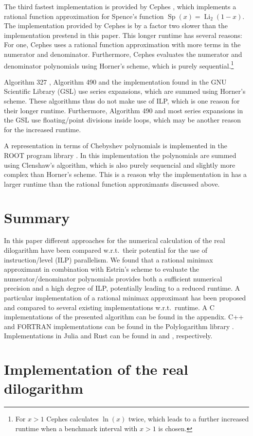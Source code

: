\documentclass[10pt,DIV16,twocolumn,numbers=noenddot]{scrartcl}
\newcommand{\Li}{\operatorname{Li}_2}
\begin{document}
The third fastest implementation is provided by Cephes \cite{cephes},
which implements a rational function approximation for Spence's
function $\operatorname{Sp}(x)=\Li(1-x)$.  The implementation provided
by Cephes is by a factor two slower than the implementation prestend
in this paper.  This longer runtime has several reasons: For one,
Cephes uses a rational function approximation with more terms in the
numerator and denominator.  Furthermore, Cephes evaluates the
numerator and denominator polynomials using Horner's scheme, which is
purely sequential.\footnote{For $x>1$ Cephes calculates $\ln(x)$
  twice, which leads to a further increased runtime when a benchmark
  interval with $x>1$ is chosen.}

Algorithm 327 \cite{koelbigDilog}, Algorithm 490 \cite{ginsberg} and
the implementation found in the GNU Scientific Library (GSL)
\cite{gsl} use series expansions, which are summed using Horner's
scheme.  These algorithms thus do not make use of ILP, which is one
reason for their longer runtime.  Furthermore, Algorithm 490 and most
series expansions in the GSL use floating\-/point divisions inside
loops, which may be another reason for the increased runtime.

A representation in terms of Chebyshev polynomials \cite{luke} is
implemented in the ROOT program library \cite{root}.  In this
implementation the polynomials are summed using Clenshaw's algorithm,
which is also purely sequencial and slightly more complex than
Horner's scheme.  This is a reason why the implementation in
\cite{root} has a larger runtime than the rational function
approximants discussed above.

\section{Summary}

In this paper different approaches for the numerical calculation of
the real dilogarithm have been compared w.r.t.\ their potential for
the use of instruction\-/level (ILP) parallelism.  We found that a
rational minimax approximant in combination with Estrin's scheme to
evaluate the numerator/denominator polynomials provides both a
sufficient numerical precision and a high degree of ILP, potentially
leading to a reduced runtime.  A particular implementation of a
rational minimax approximant has been proposed and compared to several
existing implementations w.r.t.\ runtime.  A C implementations of the
presented algorithm can be found in the appendix.  C++ and FORTRAN
implementations can be found in the Polylogarithm library
\cite{polylogarithm}.  Implementations in Julia and Rust can be found
in \cite{PolyLog.jl} and \cite{polylog}, respectively.

\appendix

\section{Implementation of the real dilogarithm}





\end{document}
